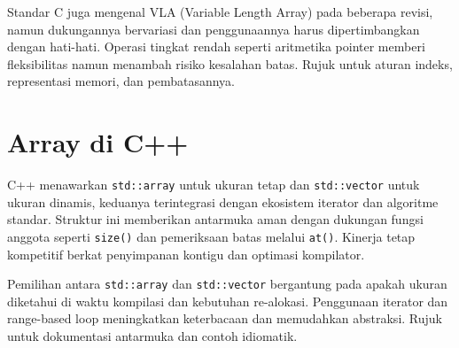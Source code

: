 \documentclass[../main.tex]{subfiles}
\begin{document}
Standar C juga mengenal VLA (Variable Length Array) pada beberapa revisi, namun dukungannya bervariasi dan penggunaannya harus dipertimbangkan dengan hati-hati. Operasi tingkat rendah seperti aritmetika pointer memberi fleksibilitas namun menambah risiko kesalahan batas. Rujuk \textcite{iso-c-draft-n1570,gnu-c-manual} untuk aturan indeks, representasi memori, dan pembatasannya.

\section{Array di C++}
C++ menawarkan \texttt{std::array} untuk ukuran tetap dan \texttt{std::vector} untuk ukuran dinamis, keduanya terintegrasi dengan ekosistem iterator dan algoritme standar. Struktur ini memberikan antarmuka aman dengan dukungan fungsi anggota seperti \texttt{size()} dan pemeriksaan batas melalui \texttt{at()}. Kinerja tetap kompetitif berkat penyimpanan kontigu dan optimasi kompilator.

Pemilihan antara \texttt{std::array} dan \texttt{std::vector} bergantung pada apakah ukuran diketahui di waktu kompilasi dan kebutuhan re-alokasi. Penggunaan iterator dan range-based loop meningkatkan keterbacaan dan memudahkan abstraksi. Rujuk \textcite{cpp-reference} untuk dokumentasi antarmuka dan contoh idiomatik.
\end{document}
